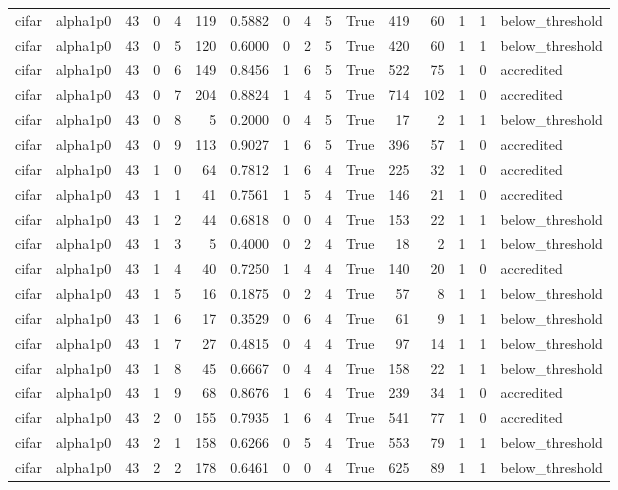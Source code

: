 \begin{tabular}{llrrrrrrrrrrrrrl}
cifar & alpha1p0 & 43 & 0 & 4 & 119 & 0.5882 & 0 & 4 & 5 & True & 419 & 60 & 1 & 1 & below\_threshold \\
cifar & alpha1p0 & 43 & 0 & 5 & 120 & 0.6000 & 0 & 2 & 5 & True & 420 & 60 & 1 & 1 & below\_threshold \\
cifar & alpha1p0 & 43 & 0 & 6 & 149 & 0.8456 & 1 & 6 & 5 & True & 522 & 75 & 1 & 0 & accredited \\
cifar & alpha1p0 & 43 & 0 & 7 & 204 & 0.8824 & 1 & 4 & 5 & True & 714 & 102 & 1 & 0 & accredited \\
cifar & alpha1p0 & 43 & 0 & 8 & 5 & 0.2000 & 0 & 4 & 5 & True & 17 & 2 & 1 & 1 & below\_threshold \\
cifar & alpha1p0 & 43 & 0 & 9 & 113 & 0.9027 & 1 & 6 & 5 & True & 396 & 57 & 1 & 0 & accredited \\
cifar & alpha1p0 & 43 & 1 & 0 & 64 & 0.7812 & 1 & 6 & 4 & True & 225 & 32 & 1 & 0 & accredited \\
cifar & alpha1p0 & 43 & 1 & 1 & 41 & 0.7561 & 1 & 5 & 4 & True & 146 & 21 & 1 & 0 & accredited \\
cifar & alpha1p0 & 43 & 1 & 2 & 44 & 0.6818 & 0 & 0 & 4 & True & 153 & 22 & 1 & 1 & below\_threshold \\
cifar & alpha1p0 & 43 & 1 & 3 & 5 & 0.4000 & 0 & 2 & 4 & True & 18 & 2 & 1 & 1 & below\_threshold \\
cifar & alpha1p0 & 43 & 1 & 4 & 40 & 0.7250 & 1 & 4 & 4 & True & 140 & 20 & 1 & 0 & accredited \\
cifar & alpha1p0 & 43 & 1 & 5 & 16 & 0.1875 & 0 & 2 & 4 & True & 57 & 8 & 1 & 1 & below\_threshold \\
cifar & alpha1p0 & 43 & 1 & 6 & 17 & 0.3529 & 0 & 6 & 4 & True & 61 & 9 & 1 & 1 & below\_threshold \\
cifar & alpha1p0 & 43 & 1 & 7 & 27 & 0.4815 & 0 & 4 & 4 & True & 97 & 14 & 1 & 1 & below\_threshold \\
cifar & alpha1p0 & 43 & 1 & 8 & 45 & 0.6667 & 0 & 4 & 4 & True & 158 & 22 & 1 & 1 & below\_threshold \\
cifar & alpha1p0 & 43 & 1 & 9 & 68 & 0.8676 & 1 & 6 & 4 & True & 239 & 34 & 1 & 0 & accredited \\
cifar & alpha1p0 & 43 & 2 & 0 & 155 & 0.7935 & 1 & 6 & 4 & True & 541 & 77 & 1 & 0 & accredited \\
cifar & alpha1p0 & 43 & 2 & 1 & 158 & 0.6266 & 0 & 5 & 4 & True & 553 & 79 & 1 & 1 & below\_threshold \\
cifar & alpha1p0 & 43 & 2 & 2 & 178 & 0.6461 & 0 & 0 & 4 & True & 625 & 89 & 1 & 1 & below\_threshold \\

\end{tabular}
